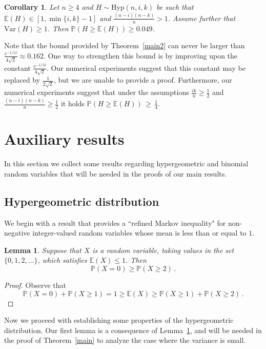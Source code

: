 \documentclass[10pt]{article}
\theoremstyle{plain}
\newtheorem{lemma}[theorem]{Lemma}
\newtheorem{corollary}[theorem]{Corollary}
\theoremstyle{definition}
\theoremstyle{remark}
\newcommand{\Prb}{\mathbb{P}}
\newcommand{\Exp}{\mathbb{E}}
\begin{document}
\begin{corollary}\label{cor_bound1}
Let $n\ge 4$ and $H\sim\text{Hyp}(n,i,k)$ be such that $\Exp(H)\in [1, \min\{i,k\}-1]$ and $\frac{(n-i)(n-k)}{n}>1$.  Assume further that $\text{Var}(H)\ge 1$.  Then
$\Prb(H\ge \Exp(H)) \ge 0.049$. 
\end{corollary}

Note that the bound provided by Theorem~\ref{main2} can never be larger than $\frac{e^{-1/12}}{4\sqrt{2}}\approx 0.162$. 
One way to strengthen this bound is by improving upon the constant $\frac{e^{-1/12}}{4\sqrt{2}}$. 
Our numerical experiments suggest that this constant may be replaced by $\frac{1}{2\sqrt{2}}$, but we are unable to provide a proof. Furthermore, our numerical experiments suggest that under the assumptions $\frac{ik}{n}\geq\frac{1}{2}$ and $\frac{(n-i)(n-k)}{n}\geq\frac{1}{2}$  it holds  
$\Prb(H\ge \Exp(H)) \,\ge\, \frac{1}{4}$. 




\section{Auxiliary results}
\label{sec:1}



In this section we collect some results regarding  hypergeometric and binomial random variables that will be needed in the proofs of our main results. 

\subsection{Hypergeometric distribution}
\label{hyp_dist1}

We begin with a result that provides a ``refined Markov inequality" for  non-negative integer-valued random variables  whose mean is less than or equal to $1$. 

 

\begin{lemma}
\label{mean_less_than_one}
Suppose that $X$ is a random variable, taking values in the set $\{0,1,2,\ldots\}$, which satisfies $\mathbb{E}(X)\le 1$. Then
\[
\Prb(X=0) \ge \Prb(X\ge 2) \, . 
\]
\end{lemma}
\begin{proof}
Observe that 
\[
\Prb(X=0) + \Prb(X\ge 1) = 1 \ge \Exp(X) \ge \Prb(X\ge 1) + \Prb(X\ge 2) \, .
\] 
\end{proof}



Now we proceed with establishing some properties of the hypergeometric distribution. Our first lemma is a consequence of Lemma~\ref{mean_less_than_one}, and will be needed in the proof of Theorem~\ref{main} to analyze the case where the variance is small. 
\end{document}
